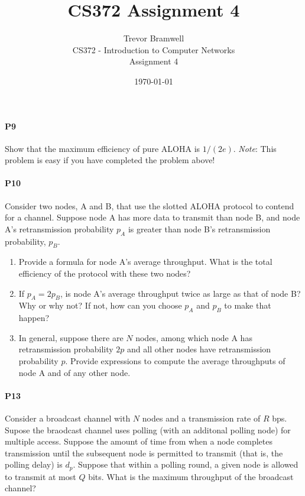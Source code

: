 \documentclass[12pt,letterpaper]{article}
\title{CS372 Assignment 4}
\author{
    Trevor Bramwell \\
    CS372 - Introduction to Computer Networks \\
    Assignment 4
}
\date{\today}
\begin{document}
\maketitle

\paragraph{P9} Show that the maximum efficiency of pure ALOHA is $1/(2e)$.
\emph{Note}: This problem is easy if you have completed the problem above!

\paragraph{P10} Consider two nodes, A and B, that use the slotted ALOHA 
protocol to contend for a channel. Suppose node A has more data to transmit 
than node B, and node A's retransmission probability $p_{A}$ is greater
than node B's retransmission probability, $p_{B}$.
\begin{enumerate}
\item Provide a formula for node A's average throughput. What is the total
    efficiency of the protocol with these two nodes?
\item If $p_{A} = 2p_{B}$, is node A's average throughput twice as large
    as that of node B? Why or why not? If not, how can you choose $p_{A}$ and 
$p_{B}$ to make that happen?
\item In general, suppose there are $N$ nodes, among which node A has
    retransmission probability $2p$ and all other nodes have retransmission
    probability $p$. Provide expressions to compute the average throughputs of
    node A and of any other node.
\end{enumerate}

\paragraph{P13}
Consider a broadcast channel with $N$ nodes and a transmission rate of $R$ bps.
Supose the braodcast channel uses polling (with an additonal polling node) for
multiple access. Suppose the amount of time from when a node completes 
transmission until the subsequent node is permitted to transmit (that is, the
polling delay) is $d_{p}$. Suppose that within a polling round, a given node is
allowed to transmit at most $Q$ bits. What is the maximum throughput of the
broadcast channel?
\end{document}
